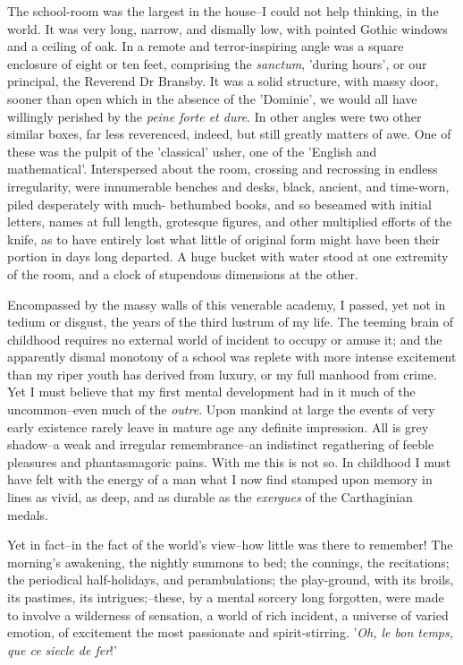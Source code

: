 \documentclass[12pt]{book}
\begin{document}
     The school-room was the largest in the house--I could not help
thinking, in the world.  It was very long, narrow, and dismally
low, with pointed Gothic windows and a ceiling of oak.  In a remote
and terror-inspiring angle was a square enclosure of eight or ten
feet, comprising the \emph{sanctum}, 'during hours', or our principal,
the Reverend Dr Bransby.  It was a solid structure, with massy
door, sooner than open which in the absence of the 'Dominie', we
would all have willingly perished by the \emph{peine forte et dure}. 
In other angles were two other similar boxes, far less reverenced,
indeed, but still greatly matters of awe.  One of these was the
pulpit of the 'classical' usher, one of the 'English and
mathematical'.  Interspersed about the room, crossing and
recrossing in endless irregularity, were innumerable benches and
desks, black, ancient, and time-worn, piled desperately with much-
bethumbed books, and so beseamed with initial letters, names at
full length, grotesque figures, and other multiplied efforts of the
knife, as to have entirely lost what little of original form might
have been their portion in days long departed.  A huge bucket with
water stood at one extremity of the room, and a clock of stupendous
dimensions at the other.

     Encompassed by the massy walls of this venerable academy, I
passed, yet not in tedium or disgust, the years of the third
lustrum of my life.  The teeming brain of childhood requires no
external world of incident to occupy or amuse it; and the
apparently dismal monotony of a school was replete with more
intense excitement than my riper youth has derived from luxury, or
my full manhood from crime.  Yet I must believe that my first
mental development had in it much of the uncommon--even much of the
\emph{outre}.  Upon mankind at large the events of very early
existence rarely leave in mature age any definite impression. 
All is grey shadow--a weak and irregular remembrance--an indistinct
regathering of feeble pleasures and phantasmagoric pains.  With me
this is not so.  In childhood I must have felt with the energy of
a man what I now find stamped upon memory in lines as vivid, as
deep, and as durable as the \emph{exergues} of the Carthaginian
medals.

     Yet in fact--in the fact of the world's view--how little was
there to remember!  The morning's awakening, the nightly summons to
bed; the connings, the recitations; the periodical half-holidays,
and perambulations; the play-ground, with its broils, its pastimes,
its intrigues;--these, by a mental sorcery long forgotten, were
made to involve a wilderness of sensation, a world of rich
incident, a universe of varied emotion, of excitement the most
passionate and spirit-stirring.  '\emph{Oh, le bon temps, que ce
siecle de fer}!'
\end{document}
